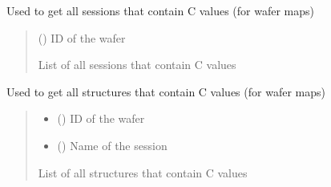 \documentclass[letterpaper,10pt,english]{sphinxmanual}
\begin{document}

\begin{fulllineitems}
\label{\detokenize{getter:getter.get_C_sessions}}
\pysigstartsignatures
{}
\pysigstopsignatures
\sphinxAtStartPar
Used to get all sessions that contain C values (for wafer maps)
\begin{quote}\begin{description}
\sphinxAtStartPar
{} () \textendash{} ID of the wafer

\sphinxAtStartPar
List of all sessions that contain C values

\end{description}\end{quote}

\end{fulllineitems}


\begin{fulllineitems}
\label{\detokenize{getter:getter.get_C_structures}}
\pysigstartsignatures
{}
\pysigstopsignatures
\sphinxAtStartPar
Used to get all structures that contain C values (for wafer maps)
\begin{quote}\begin{description}
\begin{itemize}
\item {} 
\sphinxAtStartPar
{} () \textendash{} ID of the wafer

\item {} 
\sphinxAtStartPar
{} () \textendash{} Name of the session

\end{itemize}

\sphinxAtStartPar
List of all structures that contain C values

\end{description}\end{quote}

\end{fulllineitems}
\end{document}
